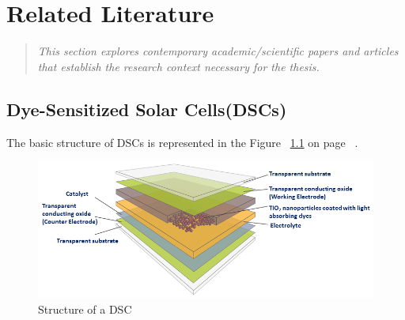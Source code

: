 \chapter{Related Literature}
\begin{quote} 
\textit{This section explores contemporary academic/scientific papers and articles that establish the research context necessary for the thesis.} 
\end{quote}


  
\section{Dye-Sensitized Solar Cells(DSCs)}

The basic structure of \ac{DSCs} is represented in the Figure ~\ref{fig:DSC_struc} on page ~\pageref{fig:DSC_struc}. 

\begin{figure}[H]
\begin{center}
\includegraphics[width=\textwidth]{images/DSCs_struc}
\caption{Structure of a DSC }
\label{fig:DSC_struc}
\end{center}
\end{figure}

